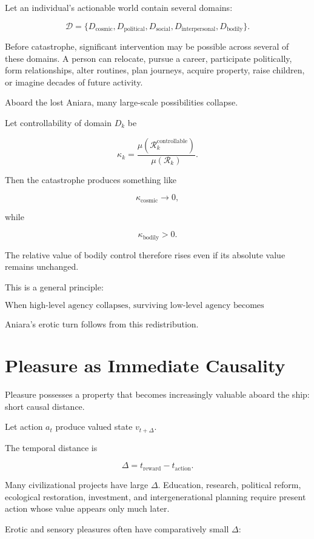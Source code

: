 \documentclass[11pt,oneside]{book}
\theoremstyle{definition}
\theoremstyle{remark}
\newcommand{\R}{\mathcal{R}}
\begin{document}
Let an individual's actionable world contain several domains:

\[
\mathcal D
=
\{
D_{\mathrm{cosmic}},
D_{\mathrm{political}},
D_{\mathrm{social}},
D_{\mathrm{interpersonal}},
D_{\mathrm{bodily}}
\}.
\]

Before catastrophe, significant intervention may be possible across several of these domains. A person can relocate, pursue a career, participate politically, form relationships, alter routines, plan journeys, acquire property, raise children, or imagine decades of future activity.

Aboard the lost Aniara, many large-scale possibilities collapse.

Let controllability of domain \(D_k\) be

\[
\kappa_k
=
\frac{
\mu(\R_k^{\mathrm{controllable}})
}{
\mu(\R_k)
}.
\]

Then the catastrophe produces something like

\[
\kappa_{\mathrm{cosmic}}
\rightarrow0,
\]

while

\[
\kappa_{\mathrm{bodily}}>0.
\]

The relative value of bodily control therefore rises even if its absolute value remains unchanged.

This is a general principle:

\[
\boxed{
\text{When high-level agency collapses, surviving low-level agency becomes disproportionately salient.}
}
\]

Aniara's erotic turn follows from this redistribution.

\section{Pleasure as Immediate Causality}

Pleasure possesses a property that becomes increasingly valuable aboard the ship: short causal distance.

Let action \(a_t\) produce valued state \(v_{t+\Delta}\).

The temporal distance is

\[
\Delta
=
t_{\mathrm{reward}}-t_{\mathrm{action}}.
\]

Many civilizational projects have large \(\Delta\). Education, research, political reform, ecological restoration, investment, and intergenerational planning require present action whose value appears only much later.

Erotic and sensory pleasures often have comparatively small \(\Delta\):
\end{document}
